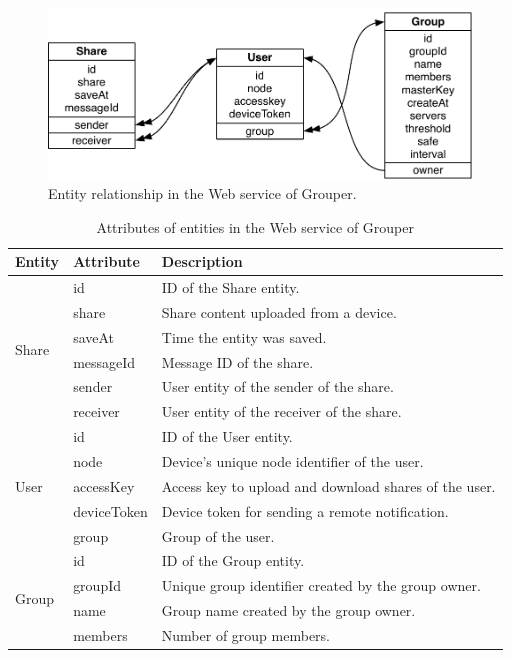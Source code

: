 \documentclass[a4paper,11pt]{report}
\begin{document}
\begin{figure}
	\centering
	\includegraphics[scale=0.75]{server_entities}
	\caption{Entity relationship in the Web service of Grouper.}
	\label{fig:server_entities}
\end{figure}

\begin{table}[t]
	\centering
	\caption{Attributes of entities in the Web service of Grouper}
	\label{table:entity_attributes}
	\begin{tabular}{@{}lll@{}}
		\toprule
		\textbf{Entity} & \textbf{Attribute} & \textbf{Description} \\ \midrule
		\multirow{6}{*}{Share} & id & ID of the Share entity. \\
		& share & Share content uploaded from a device. \\ 
		& saveAt & Time the entity was saved. \\
		& messageId & Message ID of the share.\\
		& sender & User entity of the sender of the share. \\
		& receiver & User entity of the receiver of the share.  \\
		\hline
		\multirow{5}{*}{User} & id & ID of the User entity. \\
		& node & Device's unique node identifier of the user. \\
		& accessKey & Access key to upload and download shares of the user. \\
		& deviceToken & Device token for sending a remote notification. \\
		& group & Group of the user.  \\
		\hline
		\multirow{11}{*}{Group} & id & ID of the Group entity. \\
		& groupId & Unique group identifier created by the group owner. \\
		& name & Group name created by the group owner. \\
		& members & Number of group members. \\

\end{tabular}
\end{table}
\end{document}
